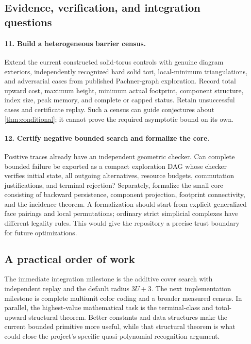 \subsection{Evidence, verification, and integration questions}

\paragraph{11. Build a heterogeneous barrier census.}
Extend the current constructed solid-torus controls with genuine diagram
exteriors, independently recognized hard solid tori, local-minimum
triangulations, and adversarial cases from published Pachner-graph
exploration. Record total upward cost, maximum height, minimum actual
footprint, component structure, index size, peak memory, and complete or
capped status. Retain unsuccessful cases and certificate replay. Such a
census can guide conjectures about \cref{thm:conditional}; it cannot prove
the required asymptotic bound on its own.

\paragraph{12. Certify negative bounded search and formalize the core.}
Positive traces already have an independent geometric checker. Can complete
bounded failure be exported as a compact exploration DAG whose checker
verifies initial state, all outgoing alternatives, resource budgets,
commutation justifications, and terminal rejection? Separately, formalize
the small core consisting of backward persistence, component projection,
footprint connectivity, and the incidence theorem. A formalization should
start from explicit generalized face pairings and local permutations;
ordinary strict simplicial complexes have different legality rules. This
would give the repository a precise trust boundary for future optimizations.

\subsection{A practical order of work}

The immediate integration milestone is the additive cover search with
independent replay and the default radius $3U+3$. The next implementation
milestone is complete multiunit color coding and a broader measured census.
In parallel, the highest-value mathematical task is the terminal-class
and total-upward structural theorem. Better constants and data structures
make the current bounded primitive more useful, while that structural
theorem is what could close the project's specific quasi-polynomial
recognition argument.

